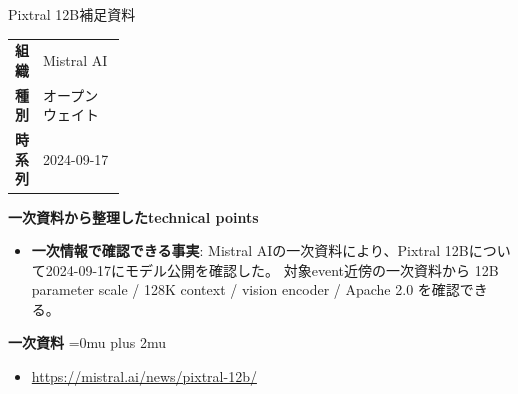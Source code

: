 \begin{technicalnote}{Pixtral 12B}{補足資料}
\begingroup
\begin{tabularx}{\linewidth}{@{}>{\bfseries}p{0.22\linewidth}X@{}}
組織 & Mistral AI \\
種別 & オープンウェイト \\
時系列 & 2024-09-17 \\
\end{tabularx}
\smallskip
{\bfseries 一次資料から整理したtechnical points}
\begin{itemize}[leftmargin=1.5em,itemsep=0.35em]
\item \textbf{一次情報で確認できる事実}: Mistral AIの一次資料により、Pixtral 12Bについて2024-09-17にモデル公開を確認した。 対象event近傍の一次資料から 12B parameter scale / 128K context / vision encoder / Apache 2.0 を確認できる。
\end{itemize}
\begin{minipage}{\linewidth}
\begin{samepage}
{\bfseries 一次資料}
\begingroup\sloppy
\Urlmuskip=0mu plus 2mu\relax
\begin{itemize}[leftmargin=1.5em,itemsep=0.25em]
\item {\scriptsize\url{https://mistral.ai/news/pixtral-12b/}}
\end{itemize}
\endgroup
\end{samepage}
\end{minipage}
\endgroup
\end{technicalnote}
\medskip

